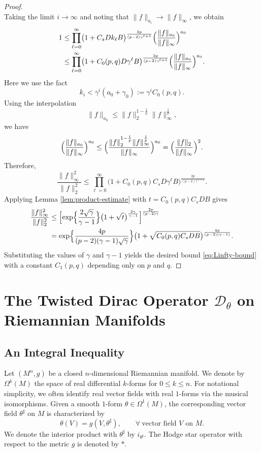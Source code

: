 \documentclass[12pt, twoside]{article}
\theoremstyle{definition}
\numberwithin{equation}{section}
\begin{document}
\begin{proof}
{\[		\]    
		Taking the limit \(i\to\infty\) and noting that \(\|f\|_{a_i} \to \|f\|_\infty\), we obtain
		\begin{align*}
		1 &\le \prod_{\ell=0}^{\infty} \bigl(1 + C_s D k_\ell B\bigr)^{\frac{2p}{(p-2)\gamma^{\ell+1}}}
		\Bigl(\frac{\|f\|_{a_0}}{\|f\|_\infty}\Bigr)^{a_0} \\
		&\le \prod_{\ell=0}^{\infty} \bigl(1 + C_0(p,q) D \gamma^{\ell} B\bigr)^{\frac{2p}{(p-2)\gamma^{\ell+1}}}
		\Bigl(\frac{\|f\|_{a_0}}{\|f\|_\infty}\Bigr)^{a_0}.
		\end{align*}    
		Here we use the fact
		\[k_{i}<\gamma^{i}(a_{0}+\gamma_{0}):=\gamma^{i}C_{0}(p,q).\]
		Using the interpolation 
		$$\|f\|_{a_0} \le \|f\|_2^{1-\frac{1}{p}} \|f\|_\infty^{\frac{1}{p}},$$ we have
		\[
		\Bigl(\frac{\|f\|_{a_0}}{\|f\|_\infty}\Bigr)^{a_0}
		\le \Bigl(\frac{\|f\|_2^{1-\frac{1}{p}} \|f\|_\infty^{\frac{1}{p}}}{\|f\|_\infty}\Bigr)^{a_0}
		= \Bigl(\frac{\|f\|_2}{\|f\|_\infty}\Bigr)^{2}.
		\]
		Therefore,
		\[
		\frac{\|f\|_\infty^2}{\|f\|_2^2}
		\le \prod_{\ell=0}^{\infty} 
		\bigl(1 + C_{0}(p,q)C_s D \gamma^{\ell} B\bigr)^{\frac{2p}{(p-2)\gamma^{\ell+1}}}.
		\]
	}Applying Lemma \ref{lem:product-estimate} with \(t = C_0(p,q)C_s D B\) gives
		\begin{equation*}
		\begin{split}
		\frac{\|f\|_\infty^2}{\|f\|_2^2}
		&\le\Bigl [\exp\Bigl\{\frac{2\sqrt{\gamma}}{\gamma-1}\Bigr\}
		\bigl(1+\sqrt{t}\bigr)^{\frac{2\gamma}{\gamma-1}}\Bigr]^{\frac{2p}{(p-2)\gamma}}\\
		&=\exp\Bigl\{\frac{4p}{(p-2)(\gamma-1)\sqrt{\gamma}}\Bigr\}
		\bigl(1 + \sqrt{C_{0}(p,q)C_s D B}\bigr)^{\frac{4p}{(p-2)(\gamma-1)}}.		
		\end{split}
		\end{equation*}
		Substituting the values of \(\gamma\) and \(\gamma-1\) yields the desired bound \eqref{eq:Linfty-bound} with a constant \(C_1(p,q)\) depending only on \(p\) and \(q\).
	\end{proof}
	
	
	\section{The Twisted Dirac Operator \(\mathcal{D}_{\theta}\) on Riemannian Manifolds}
	
	\subsection{An Integral Inequality}
	Let \((M^{n},g)\) be a closed \(n\)-dimensional Riemannian manifold. We denote by \(\Omega^{k}(M)\) the space of real differential \(k\)-forms for \(0\le k\le n\). For notational simplicity, we often identify real vector fields with real \(1\)-forms via the musical isomorphisms. Given a smooth \(1\)-form \(\theta\in\Omega^{1}(M)\), the corresponding vector field \(\theta^{\sharp}\) on \(M\) is characterized by
	\[
	\theta(V)=g(V,\theta^{\sharp}),\qquad\forall\ \text{vector field }V\text{ on }M.
	\]
	We denote the interior product with \(\theta^{\sharp}\) by \(i_{\theta^{\sharp}}\). The Hodge star operator with respect to the metric \(g\) is denoted by \(\ast\).
	
\end{document}
